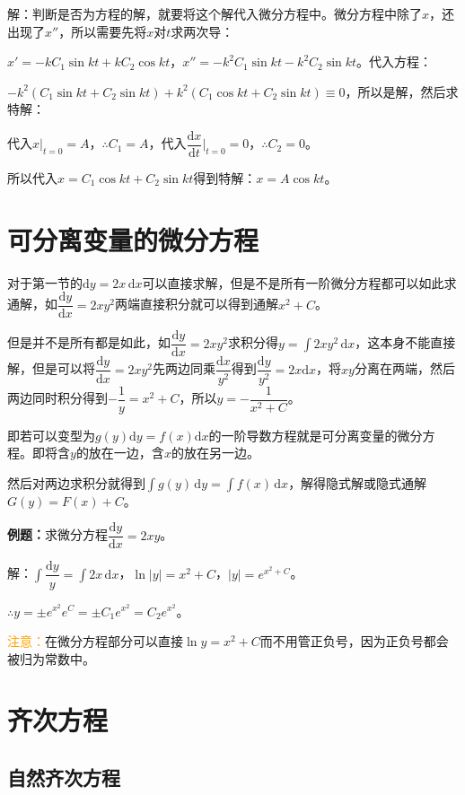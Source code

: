 \documentclass[UTF8, 12pt]{ctexart}
\begin{document}
解：判断是否为方程的解，就要将这个解代入微分方程中。微分方程中除了$x$，还出现了$x''$，所以需要先将$x$对$t$求两次导：

$x'=-kC_1\sin kt+kC_2\cos kt$，$x''=-k^2C_1\sin kt-k^2C_2\sin kt$。代入方程：

$-k^2(C_1\sin kt+C_2\sin kt)+k^2(C_1\cos kt+C_2\sin kt)\equiv0$，所以是解，然后求特解：

代入$x\vert_{t=0}=A$，$\therefore C_1=A$，代入$\dfrac{\textrm{d}x}{\textrm{d}t}\bigg\vert_{t=0}=0$，$\therefore C_2=0$。

所以代入$x=C_1\cos kt+C_2\sin kt$得到特解：$x=A\cos kt$。

\section{可分离变量的微分方程}

对于第一节的$\textrm{d}y=2x\,\textrm{d}x$可以直接求解，但是不是所有一阶微分方程都可以如此求通解，如$\dfrac{\textrm{d}y}{\textrm{d}x}=2xy^2$两端直接积分就可以得到通解$x^2+C$。

但是并不是所有都是如此，如$\dfrac{\textrm{d}y}{\textrm{d}x}=2xy^2$求积分得$y=\int2xy^2\,\textrm{d}x$，这本身不能直接解，但是可以将$\dfrac{\textrm{d}y}{\textrm{d}x}=2xy^2$先两边同乘$\dfrac{\textrm{d}x}{y^2}$得到$\dfrac{\textrm{d}y}{y^2}=2x\textrm{d}x$，将$xy$分离在两端，然后两边同时积分得到$-\dfrac{1}{y}=x^2+C$，所以$y=-\dfrac{1}{x^2+C}$。

即若可以变型为$g(y)\textrm{d}y=f(x)\textrm{d}x$的一阶导数方程就是可分离变量的微分方程。即将含$y$的放在一边，含$x$的放在另一边。

然后对两边求积分就得到$\int g(y)\,\textrm{d}y=\int f(x)\,\textrm{d}x$，解得隐式解或隐式通解$G(y)=F(x)+C$。

\textbf{例题：}求微分方程$\dfrac{\textrm{d}y}{\textrm{d}x}=2xy$。

解：$\displaystyle{\int\dfrac{\textrm{d}y}{y}}=\int2x\,\textrm{d}x$，$\ln\vert y\vert=x^2+C$，$\vert y\vert=e^{x^2+C}$。

$\therefore y=\pm e^{x^2}e^C=\pm C_1e^{x^2}=C_2e^{x^2}$。

\textcolor{orange}{注意：}在微分方程部分可以直接$\ln y=x^2+C$而不用管正负号，因为正负号都会被归为常数中。

\section{齐次方程}

\subsection{自然齐次方程}
\end{document}
